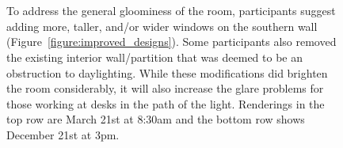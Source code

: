 \begin{figure}[t]
\vspace{-0.277\textwidth}
\begin{small}
\begin{minipage}[b]{\figwidth}~{\color{white}{\bf A1 original}}\end{minipage} 
\begin{minipage}[b]{\figwidth}~{\color{white}{\bf renovation}}\end{minipage}
 \hfill
\begin{minipage}[b]{\figwidth}~{\color{white}{\bf A4 original}}\end{minipage} 
\begin{minipage}[b]{\figwidth}~{\color{white}{\bf renovation}}\end{minipage} 
\hfill
\begin{minipage}[b]{\figwidth}~{\color{white}{\bf N1 original}}\end{minipage} 
\begin{minipage}[b]{\figwidth}~{\color{white}{\bf renovation}}\end{minipage}\\
\end{small}
\vspace{0.19\textwidth}

\caption{To address the general gloominess of the room, participants
  suggest adding more, taller, and/or wider windows on the southern
  wall (Figure~\ref{figure:improved_designs}).  Some participants also
  removed the existing interior wall/partition that was deemed to be
  an obstruction to daylighting.  While these modifications did
  brighten the room considerably, it will also increase the glare
  problems for those working at desks in the path of the light.
  Renderings in the top row are March 21st at 8:30am and the bottom
  row shows December 21st at 3pm.
  \label{figure:brighter_renovations}
  }

\vspace{-0.1in}
\end{figure}

